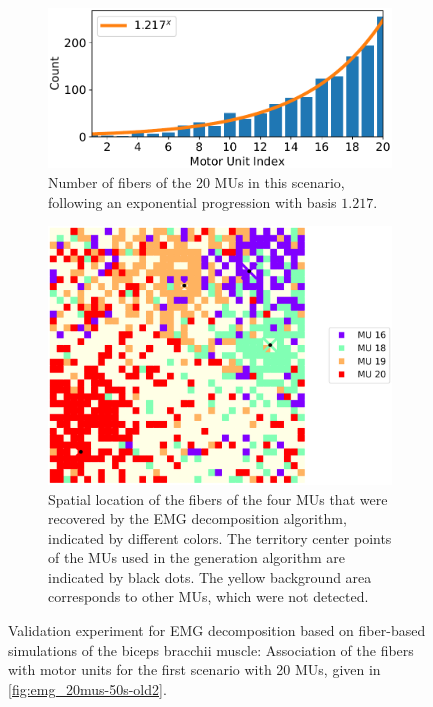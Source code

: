 \begin{figure}
  \centering%
  \begin{subfigure}[t]{0.45\textwidth}%
    \centering%
    \includegraphics[width=\textwidth]{images/results/application/oldmus2.pdf}%
    \caption{Number of fibers of the 20 MUs in this scenario, following an exponential progression with basis $1.217$.}%
    \label{fig:oldmus_progression}%
  \end{subfigure}\hfill
  \begin{subfigure}[t]{0.45\textwidth}%
    \centering%
    \includegraphics[width=\textwidth]{images/results/application/oldmus1.pdf}%
    \caption{Spatial location of the fibers of the four MUs that were recovered by the EMG decomposition algorithm, indicated by different colors. The territory center points of the MUs used in the generation algorithm are indicated by black dots. The yellow background area corresponds to other MUs, which were not detected.}%
    \label{fig:oldmus_2d}%
  \end{subfigure}
  \caption{Validation experiment for EMG decomposition based on fiber-based simulations of the biceps bracchii muscle: Association of the fibers with motor units for the first scenario with 20 MUs, given in \cref{fig:emg_20mus-50s-old2}.}%
  \label{fig:oldmus}%
\end{figure}


